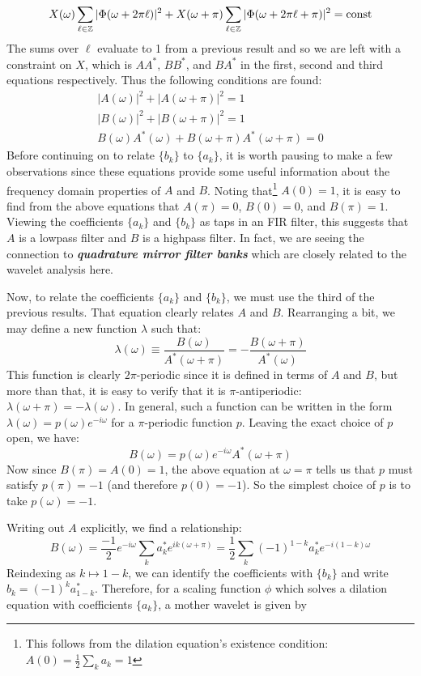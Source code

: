 \documentclass[onecolumn]{gwclass}
\begin{document}
$$ X(\omega)\sum_{\ell\in\mathbb{Z}} |\Phi(\omega + 2\pi\ell)|^2 + X(\omega + \pi)\sum_{\ell\in\mathbb{Z}} |\Phi(\omega + 2\pi\ell + \pi)|^2 = \text{\normalfont{const}}$$
The sums over $\ell$ evaluate to 1 from a previous result and so we are left with a constraint on $X$, which is $AA^*$, $BB^*$, and $BA^*$ in the first, second and third equations respectively. Thus the following conditions are found:
\begin{align*}
	\textstyle{|A(\omega)|^2 + |A(\omega + \pi)|^2 = 1} \\
	\textstyle{|B(\omega)|^2 + |B(\omega + \pi)|^2 = 1}\\
	\textstyle{B(\omega)A^*(\omega) + B(\omega + \pi)A^*(\omega + \pi) = 0}
\end{align*}
Before continuing on to relate $\{b_k\}$ to $\{a_k\}$, it is worth pausing to make a few observations since these equations provide some useful information about the frequency domain properties of $A$ and $B$. Noting that\footnote{This follows from the dilation equation's existence condition: $A(0)=\frac{1}{2}\sum_k a_k = 1$} $A(0)=1$, it is easy to find from the above equations that $A(\pi)=0$, $B(0)=0$, and $B(\pi)=1$. Viewing the coefficients $\{a_k\}$ and $\{b_k\}$ as taps in an FIR filter, this suggests that $A$ is a lowpass filter and $B$ is a highpass filter. In fact, we are seeing the connection to \textbf{\emph{quadrature mirror filter banks}} which are closely related to the wavelet analysis here.

Now, to relate the coefficients $\{a_k\}$ and $\{b_k\}$, we must use the third of the previous results. That equation clearly relates $A$ and $B$. Rearranging a bit, we may define a new function $\lambda$ such that:
$$ \lambda(\omega)\equiv\frac{B(\omega)}{A^*(\omega + \pi)}= - \frac{B(\omega + \pi)}{A^*(\omega)}$$
This function is clearly $2\pi$-periodic since it is defined in terms of $A$ and $B$, but more than that, it is easy to verify that it is $\pi$-antiperiodic: $\lambda(\omega + \pi) = -\lambda(\omega)$. In general, such a function can be written in the form $\lambda(\omega)=p(\omega)e^{-i\omega}$ for a $\pi$-periodic function $p$. Leaving the exact choice of $p$ open, we have:
$$B(\omega) = p(\omega)e^{-i\omega}A^*(\omega + \pi) $$
Now since $B(\pi)=A(0)=1$, the above equation at $\omega=\pi$ tells us that $p$ must satisfy $p(\pi)=-1$ (and therefore $p(0)=-1$). So the simplest choice of $p$ is to take $p(\omega)=-1$. 

Writing out $A$ explicitly, we find a relationship:
$$B(\omega) = \frac{-1}{2} e^{-i\omega}\sum_k a_k^* e^{ik(\omega + \pi)} = \frac{1}{2}\sum_k (-1)^{1-k} a_k^* e^{-i(1-k)\omega}  $$
Reindexing as $k\mapsto 1-k$, we can identify the coefficients with $\{b_k\}$ and write $ b_k = (-1)^k a_{1-k}^* $. Therefore, for a scaling function $\phi$ which solves a dilation equation with coefficients $\{a_k\}$, a mother wavelet is given by
\end{document}
